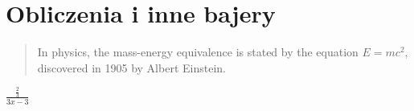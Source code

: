 \section{Obliczenia i inne bajery}

\begin{quote}
    In physics, the mass-energy equivalence is stated 
    by the equation \begin{math}E=mc^2\end{math}, discovered in 1905 by Albert Einstein.
\end{quote}


\begin{center}
    \huge
    \begin{math}
        \frac{\tfrac{2}{3}}{3x-3}
    \end{math}
\end{center}

